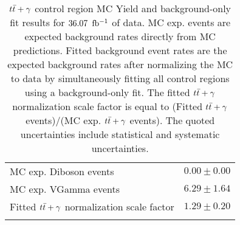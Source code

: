 \begin{table}[!h]
\begin{center}
{\begin{tabular*}{\textwidth}{@{\extracolsep{\fill}}lr}
        MC exp. Diboson events         & $0.00 \pm 0.00$              \\
        MC exp. VGamma events         & $6.29 \pm 1.64$              \\
\noalign{\smallskip}\hline\noalign{\smallskip}
Fitted $\ttbar+\gamma$ normalization scale factor & $1.29 \pm 0.20$ \\
\noalign{\smallskip}\hline\noalign{\smallskip}
\end{tabular*}
}
\end{center}
\caption[$\ttbar+\gamma$ control region MC Yield and background-only fit results for $\intlumi$ $\ifb$ of data]{$\ttbar+\gamma$ control region MC Yield and background-only fit results for $\intlumi$ $\ifb$ of data. MC exp. events are expected background rates directly from MC predictions.  Fitted background event rates are the expected background rates after normalizing the MC to data by simultaneously fitting all control regions using a background-only fit.  The fitted $\ttbar+\gamma$ normalization scale factor is equal to (Fitted $\ttbar+\gamma$ events)/(MC exp. $\ttbar+\gamma$ events). The quoted uncertainties include statistical and systematic uncertainties. }
\label{table.bkgonly.CRTTgamma}
\end{table}
%